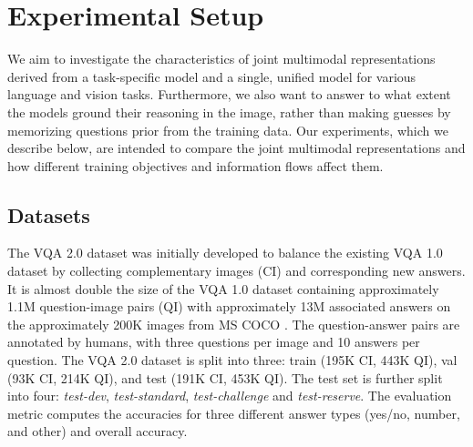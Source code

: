\documentclass{article}
\begin{document}
\section{Experimental Setup}
We aim to investigate the characteristics of joint multimodal representations derived from a task-specific model and a single, unified model for various language and vision tasks. Furthermore, we also want to answer to what extent the models ground their reasoning in the image, rather than making guesses by memorizing questions prior from the training data. Our experiments, which we describe below, are intended to compare the joint multimodal representations and how different training objectives and information flows affect them.


\subsection{Datasets} \label{subsection:datasets}

The VQA 2.0 dataset \citep{goyal2017vqa2} was initially developed to balance the existing VQA 1.0 dataset \citet{antol2015vqa} by collecting complementary images (CI) and corresponding new answers. It is almost double the size of the VQA 1.0 dataset containing approximately 1.1M question-image pairs (QI) with approximately 13M associated answers on the approximately 200K images from MS COCO \citep{coco}. The question-answer pairs are annotated by humans, with three questions per image and 10 answers per question. The VQA 2.0 dataset is split into three: train (195K CI, 443K QI), val (93K CI, 214K QI), and test (191K CI, 453K QI). The test set is further split into four: \textit{test-dev}, \textit{test-standard}, \textit{test-challenge} and \textit{test-reserve}. The evaluation metric computes the accuracies for three different answer types (yes/no, number, and other) and overall accuracy.
\end{document}
